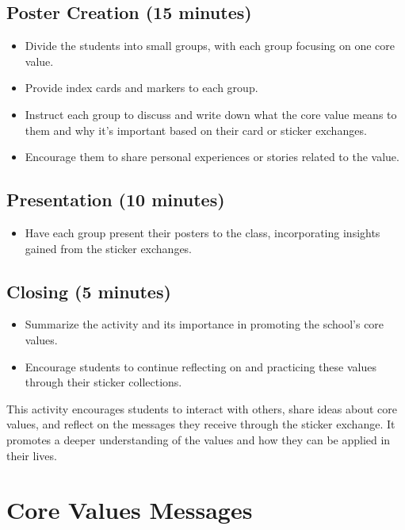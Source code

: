 \documentclass[11pt]{article}
\begin{document}
\subsection{Poster Creation (15 minutes)}
\label{sec:org9997541}
\begin{itemize}
\item Divide the students into small groups, with each group focusing on one core
value.
\item Provide index cards and markers to each group.
\item Instruct each group to discuss and write down what the core value means to them
and why it's important based on their card or sticker exchanges.
\item Encourage them to share personal experiences or stories related to the value.
\end{itemize}

\subsection{Presentation (10 minutes)}
\label{sec:org37328ea}
\begin{itemize}
\item Have each group present their posters to the class, incorporating insights
gained from the sticker exchanges.
\end{itemize}

\subsection{Closing (5 minutes)}
\label{sec:org85a7b35}
\begin{itemize}
\item Summarize the activity and its importance in promoting the school's core values.
\item Encourage students to continue reflecting on and practicing these values through
their sticker collections.
\end{itemize}

This activity encourages students to interact with others, share ideas about core values, and reflect on the messages they receive through the sticker exchange. It promotes a deeper understanding of the values and how they can be applied in their lives.

\section{Core Values Messages}
\label{sec:org009650f}
\end{document}
